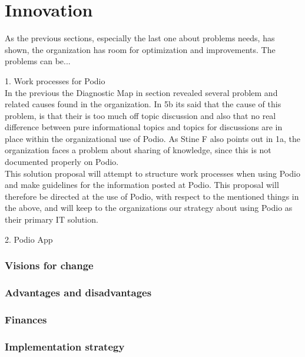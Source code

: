 \part{Innovation}
As the previous sections, especially the last one about problems needs, has shown, the organization has room for optimization and improvements. The problems can be...


1. Work processes for Podio\\
In the previous the Diagnostic Map in section revealed several problem and related causes found in the organization. In 5b its said that the cause of this problem, is that their is too much off topic discussion and also that no real difference between pure informational topics and topics for discussions are in place within the organizational use of Podio. As Stine F also points out in 1a, the organization faces a problem about sharing of knowledge, since this is not documented properly on Podio.\\

This solution proposal will attempt to structure work processes when using Podio and make guidelines for the information posted at Podio. This proposal will therefore be directed at the use of Podio, with respect to the mentioned things in the above, and will keep to the organizations our strategy about using Podio as their primary IT solution. 

2. Podio App

\section{Visions for change}

\section{Advantages and disadvantages}


\section{Finances}

\section{Implementation strategy}


